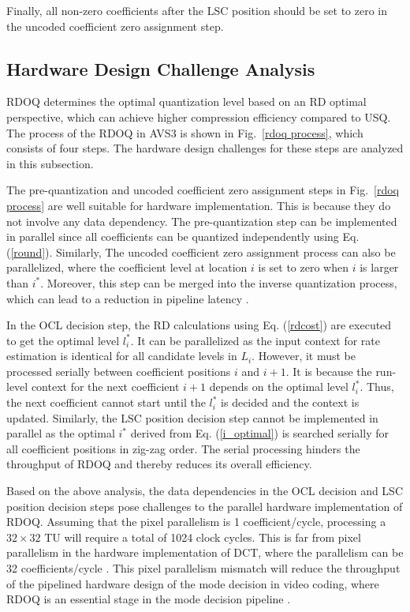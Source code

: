 \documentclass[lettersize,journal]{IEEEtran}
\begin{document}
Finally, all non-zero coefficients after the LSC position should be set to zero in the uncoded coefficient zero assignment step. 

\subsection{Hardware Design Challenge Analysis}
\label{subsec:B}
RDOQ determines the optimal quantization level based on an RD optimal perspective, which can achieve higher compression efficiency compared to USQ. The process of the RDOQ in AVS3 is shown in Fig.~\ref{rdoq process}, which consists of four steps. The hardware design challenges for these steps are analyzed in this subsection. 

The pre-quantization and uncoded coefficient zero assignment steps in Fig.~\ref{rdoq process} are well suitable for hardware implementation. This is because they do not involve any data dependency. The pre-quantization step can be implemented in parallel since all coefficients can be quantized independently using Eq. (\ref{round}). Similarly, The uncoded coefficient zero assignment process can also be parallelized, where the coefficient level at location $i$ is set to zero when $i$ is larger than $i_{}^{*}$. Moreover, this step can be merged into the inverse quantization process, which can lead to a reduction in pipeline latency \cite{braatz2018high}. 

In the OCL decision step, the RD calculations using Eq. (\ref{rdcost}) are executed to get the optimal level $l_{i}^{*}$. It can be parallelized as the input context for rate estimation is identical for all candidate levels in $L_{i}$. However, it must be processed serially between coefficient positions $i$ and $i+1$. It is because the run-level context for the next coefficient $i+1$ depends on the optimal level $l_{i}^{*}$. Thus, the next coefficient cannot start until the $l_{i}^{*}$ is decided and the context is updated. Similarly, the LSC position decision step cannot be implemented in parallel as the optimal $i_{}^{*}$ derived from Eq. (\ref{i_optimal}) is searched serially for all coefficient positions in zig-zag order. The serial processing hinders the throughput of RDOQ and thereby reduces its overall efficiency. 

Based on the above analysis, the data dependencies in the OCL decision and LSC position decision steps pose challenges to the parallel hardware implementation of RDOQ. Assuming that the pixel parallelism is 1 coefficient/cycle, processing a $32\times32$ TU will require a total of 1024 clock cycles. This is far from pixel parallelism in the hardware implementation of DCT, where the parallelism can be 32 coefficients/cycle \cite{meher2013efficient,fan2019pipelined,Hao2023Multiple}. This pixel parallelism mismatch will reduce the throughput of the pipelined hardware design of the mode decision in video coding, where RDOQ is an essential stage in the mode decision pipeline \cite{sun2017fast,zhang2018efficient,huang2018three,zhang2018highly}.
\end{document}
